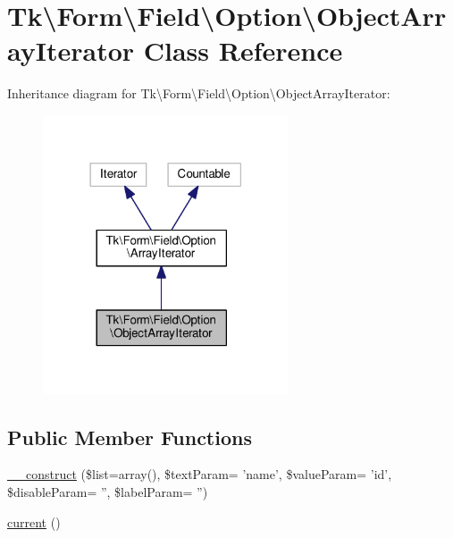 \hypertarget{classTk_1_1Form_1_1Field_1_1Option_1_1ObjectArrayIterator}{\section{Tk\textbackslash{}Form\textbackslash{}Field\textbackslash{}Option\textbackslash{}Object\+Array\+Iterator Class Reference}
\label{classTk_1_1Form_1_1Field_1_1Option_1_1ObjectArrayIterator}
}


Inheritance diagram for Tk\textbackslash{}Form\textbackslash{}Field\textbackslash{}Option\textbackslash{}Object\+Array\+Iterator\+:\nopagebreak
\begin{figure}[H]
\begin{center}
\leavevmode
\includegraphics[width=206pt]{classTk_1_1Form_1_1Field_1_1Option_1_1ObjectArrayIterator__inherit__graph}
\end{center}
\end{figure}
\subsection*{Public Member Functions}
\begin{DoxyCompactItemize}
\item 
\hyperlink{classTk_1_1Form_1_1Field_1_1Option_1_1ObjectArrayIterator_a909bcf9418e5ef868e9ff78e30ad186c}{\+\_\+\+\_\+construct} (\$list=array(), \$text\+Param= 'name', \$value\+Param= 'id', \$disable\+Param= '', \$label\+Param= '')
\item 
\hyperlink{classTk_1_1Form_1_1Field_1_1Option_1_1ObjectArrayIterator_a701c841b73d3724ac5e97c309f5e3e12}{current} ()
\end{DoxyCompactItemize}
